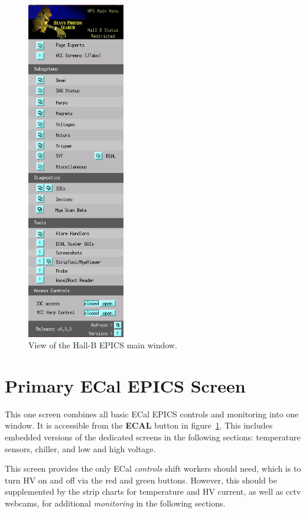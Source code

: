 \documentclass[12pt]{article}
\begin{document}
\begin{figure}[h!]
\center
\includegraphics[width=0.38\textwidth]{pics/hps_epics_2015_09_18.png}
\caption{ \label{EPICSmain} View of the Hall-B EPICS main window.}
\end{figure}

 \onecolumn

 \section{Primary ECal EPICS Screen}
 This one screen combines all basic ECal EPICS controls and monitoring into one window.  It is accessible from the {\bf ECAL} button in figure~\ref{EPICSmain}.  This includes embedded versions of the dedicated screens in the following sections:  temperature sensors, chiller, and low and high voltage.  
 
 This screen provides the only ECal {\em controls} shift workers should need, which is to turn HV on and off via the red and green buttons.  However, this should be supplemented by the strip charts for temperature and HV current, as well as cctv webcams, for additional {\em monitoring} in the following sections.
\end{document}

